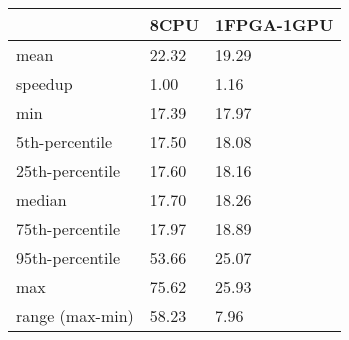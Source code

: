 \begin{tabular}{lll}
\toprule
 & 8CPU & 1FPGA-1GPU \\
\midrule
mean & 22.32 & 19.29 \\
speedup & 1.00 & 1.16 \\
min & 17.39 & 17.97 \\
5th-percentile & 17.50 & 18.08 \\
25th-percentile & 17.60 & 18.16 \\
median & 17.70 & 18.26 \\
75th-percentile & 17.97 & 18.89 \\
95th-percentile & 53.66 & 25.07 \\
max & 75.62 & 25.93 \\
range (max-min) & 58.23 & 7.96 \\
\bottomrule
\end{tabular}
